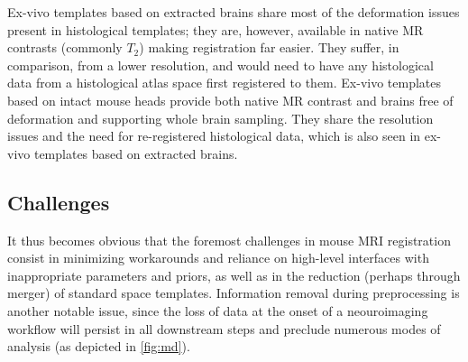 Ex-vivo templates based on extracted brains share most of the deformation issues present in histological templates;
they are, however, available in native MR contrasts (commonly $T_2$) making registration far easier.
They suffer, in comparison, from a lower resolution, and would need to have any histological data from a histological atlas space first registered to them.
Ex-vivo templates based on intact mouse heads provide both native MR contrast and brains free of deformation and supporting whole brain sampling.
They share the resolution issues and the need for re-registered histological data, which is also seen in ex-vivo templates based on extracted brains.

\subsection{Challenges}
It thus becomes obvious that the foremost challenges in mouse MRI registration consist in minimizing workarounds and reliance on high-level interfaces with inappropriate parameters and priors, as well as in the reduction (perhaps through merger) of standard space templates.
Information removal during preprocessing is another notable issue, since the loss of data at the onset of a neouroimaging workflow will persist in all downstream steps and preclude numerous modes of analysis (as depicted in \cref{fig:md}).

